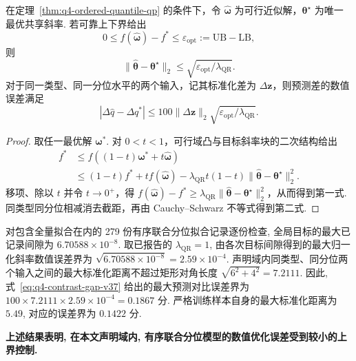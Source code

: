 \begin{corollary}[全局目标间隙到共享斜率误差]\label{cor:q4-slope-gap-v37}
在定理~\ref{thm:q4-ordered-quantile-qp} 的条件下，令 $\widehat{\boldsymbol\omega}$ 为可行近似解，$\boldsymbol\theta^\star$ 为唯一最优共享斜率. 若可靠上下界给出
\[
0\le f(\widehat{\boldsymbol\omega})-f^*\le\varepsilon_{\mathrm{opt}}:=\mathrm{UB}-\mathrm{LB},
\]
则
\begin{equation}\label{eq:q4-slope-gap-v37}
\|\widehat{\boldsymbol\theta}-\boldsymbol\theta^\star\|_2
\le\sqrt{\varepsilon_{\mathrm{opt}}/\lambda_{\mathrm{QR}}}.
\end{equation}
对于同一类型、同一分位水平的两个输入，记其标准化差为 $\Delta\boldsymbol z$，则预测差的数值误差满足
\begin{equation}\label{eq:q4-contrast-gap-v37}
|\Delta\widehat q-\Delta q^*|
\le100\|\Delta\boldsymbol z\|_2\sqrt{\varepsilon_{\mathrm{opt}}/\lambda_{\mathrm{QR}}}.
\end{equation}
\end{corollary}
\begin{proof}
取任一最优解 $\boldsymbol\omega^*$. 对 $0<t<1$，可行域凸与目标斜率块的二次结构给出
\begin{align*}
f^*&\le f((1-t)\boldsymbol\omega^*+t\widehat{\boldsymbol\omega})\\
&\le(1-t)f^*+tf(\widehat{\boldsymbol\omega})
-\lambda_{\mathrm{QR}}t(1-t)\|\widehat{\boldsymbol\theta}-\boldsymbol\theta^\star\|_2^2.
\end{align*}
移项、除以 $t$ 并令 $t\to0^+$，得
$f(\widehat{\boldsymbol\omega})-f^*\ge\lambda_{\mathrm{QR}}\|\widehat{\boldsymbol\theta}-\boldsymbol\theta^\star\|_2^2$，从而得到第一式. 同类型同分位相减消去截距，再由 Cauchy--Schwarz 不等式得到第二式. 
\end{proof}

对包含全量拟合在内的 279 份有序联合分位拟合记录逐份检查, 全局目标的最大已记录间隙为 $6.70588\times10^{-8}$. 取已报告的 $\lambda_{\mathrm{QR}}=1$, 由各次目标间隙得到的最大归一化斜率数值误差界为 $\sqrt{6.70588\times10^{-8}}=2.59\times10^{-4}$. 声明域内同类型、同分位两个输入之间的最大标准化距离不超过矩形对角长度 $\sqrt{6^2+4^2}=7.2111$. 因此, 式~\eqref{eq:q4-contrast-gap-v37} 给出的最大预测对比误差界为 $100\times7.2111\times2.59\times10^{-4}=0.1867$ 分. 严格训练样本自身的最大标准化距离为 $5.49$, 对应的误差界为 $0.1422$ 分.

\textbf{上述结果表明, 在本文声明域内, 有序联合分位模型的数值优化误差受到较小的上界控制. }


